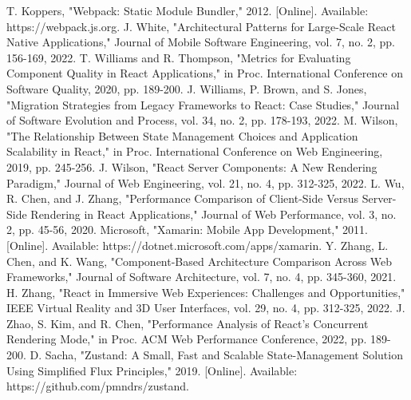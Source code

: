 \begin{thebibliography}{00}
 T. Koppers, "Webpack: Static Module Bundler," 2012. [Online]. Available: https://webpack.js.org.
 J. White, "Architectural Patterns for Large-Scale React Native Applications," Journal of Mobile Software Engineering, vol. 7, no. 2, pp. 156-169, 2022.
 T. Williams and R. Thompson, "Metrics for Evaluating Component Quality in React Applications," in Proc. International Conference on Software Quality, 2020, pp. 189-200.
 J. Williams, P. Brown, and S. Jones, "Migration Strategies from Legacy Frameworks to React: Case Studies," Journal of Software Evolution and Process, vol. 34, no. 2, pp. 178-193, 2022.
 M. Wilson, "The Relationship Between State Management Choices and Application Scalability in React," in Proc. International Conference on Web Engineering, 2019, pp. 245-256.
 J. Wilson, "React Server Components: A New Rendering Paradigm," Journal of Web Engineering, vol. 21, no. 4, pp. 312-325, 2022.
 L. Wu, R. Chen, and J. Zhang, "Performance Comparison of Client-Side Versus Server-Side Rendering in React Applications," Journal of Web Performance, vol. 3, no. 2, pp. 45-56, 2020.
 Microsoft, "Xamarin: Mobile App Development," 2011. [Online]. Available: https://dotnet.microsoft.com/apps/xamarin.
 Y. Zhang, L. Chen, and K. Wang, "Component-Based Architecture Comparison Across Web Frameworks," Journal of Software Architecture, vol. 7, no. 4, pp. 345-360, 2021.
 H. Zhang, "React in Immersive Web Experiences: Challenges and Opportunities," IEEE Virtual Reality and 3D User Interfaces, vol. 29, no. 4, pp. 312-325, 2022.
 J. Zhao, S. Kim, and R. Chen, "Performance Analysis of React's Concurrent Rendering Mode," in Proc. ACM Web Performance Conference, 2022, pp. 189-200.
 D. Sacha, "Zustand: A Small, Fast and Scalable State-Management Solution Using Simplified Flux Principles," 2019. [Online]. Available: https://github.com/pmndrs/zustand.
\end{thebibliography}